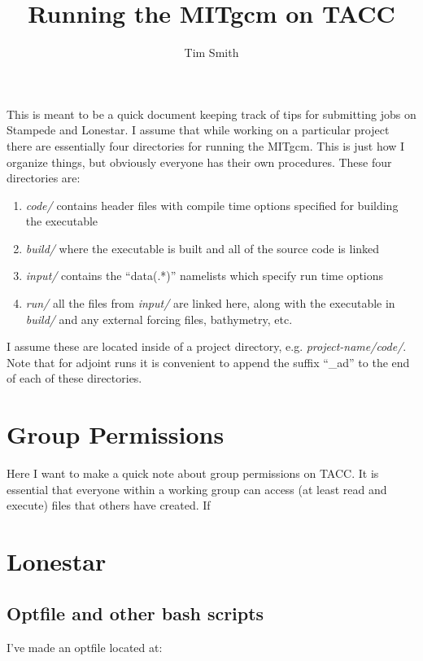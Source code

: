 \documentclass[a4paper,11pt]{article}
\title{\vspace{-10ex}Running the MITgcm on TACC}
\author{Tim Smith}
\date{\vspace{-3ex}}
\begin{document}
\maketitle

	This is meant to be a quick document keeping track of tips for submitting jobs on Stampede and Lonestar. I assume that while working on a particular project there are essentially four directories for running the MITgcm. This is just how I organize things, but obviously everyone has their own procedures. These four directories are: 

	\begin{enumerate}
	  \item \textit{code/} contains header files with compile time options specified for building the executable
	  \item \textit{build/} where the executable is built and all of the source code is linked
	  \item \textit{input/} contains the ``data(.*)'' namelists which specify run time options
	  \item \textit{run/} all the files from \textit{input/} are linked here, along with the executable in \textit{build/} and any external forcing files, bathymetry, etc. 
	\end{enumerate} 

	I assume these are located inside of a project directory, e.g. \textit{ project-name/code/}. Note that for adjoint runs it is convenient to append the suffix ``\_ad'' to the end of each of these directories. 

\section{Group Permissions}
\label{groups}

	Here I want to make a quick note about group permissions on TACC. It is essential that everyone within a working group can access (at least read and execute) files that others have created. If

\section{Lonestar} 
\label{lonestar}

	\subsection{Optfile and other bash scripts}
	
	I've made an optfile located at: 
	
\end{document}

